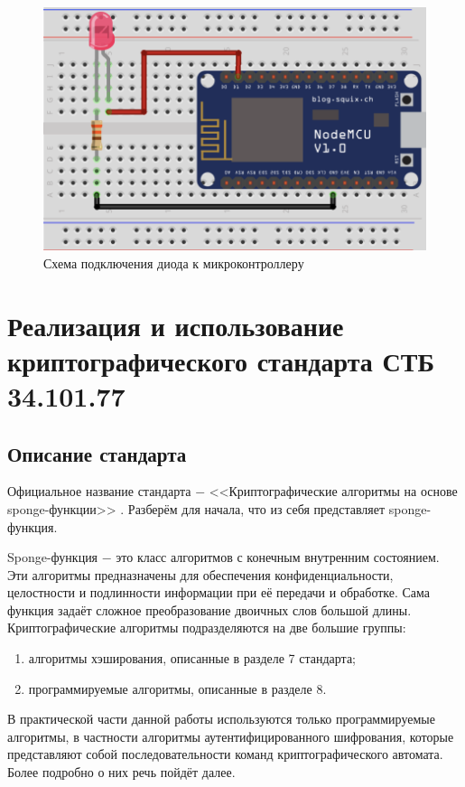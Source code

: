 	\begin{figure}[h]
		\centering
		\includegraphics[scale=0.6]{resources/esp8266-control-led}
		\caption{Схема подключения диода к микроконтроллеру}
		\label{fig4.2}
	\end{figure}
	
	
	\section{Реализация и использование криптографического стандарта СТБ 34.101.77}
	
	\subsection{Описание стандарта}
	
	Официальное название стандарта $-$ <<Криптографические алгоритмы на основе sponge-функции>> \cite{standard-77}.
	Разберём для начала, что из себя представляет sponge-функция.
	
	Sponge-функция $-$ это класс алгоритмов с конечным внутренним состоянием. Эти алгоритмы
	предназначены для обеспечения конфиденциальности, целостности и подлинности информации
	при её передачи и обработке. Сама функция задаёт сложное преобразование двоичных слов большой 
	длины. Криптографические алгоритмы подразделяются на две большие группы:
	
	\begin{enumerate}
		\item алгоритмы хэширования, описанные в разделе 7 стандарта;
		\item программируемые алгоритмы, описанные в разделе 8.
	\end{enumerate}

	В практической части данной работы используются только программируемые алгоритмы, в частности
	алгоритмы аутентифицированного шифрования, которые представляют собой последовательности 
	команд криптографического автомата. Более подробно о них речь пойдёт далее.


